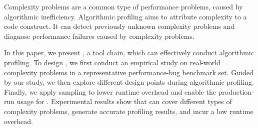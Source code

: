 Complexity problems are a common type of performance problems, 
caused by algorithmic inefficiency. 
Algorithmic profiling aims to attribute complexity to a code construct.
It can detect previously unknown complexity problems and diagnose performance failures 
caused by complexity problems. 

In this paper, we present \Tool, a tool chain, 
which can effectively conduct algorithmic profiling. 
To design \Tool, we first conduct an empirical study on 
real-world complexity problems in a representative performance-bug benchmark set. 
Guided by our study, 
we then explore different 
design points during algorithmic profiling.
Finally, we apply sampling to lower runtime 
overhead and enable the production-run usage for \Tool.
Experimental results show that \Tool 
can cover different types of complexity problems, 
generate accurate profiling results, 
and incur a low runtime overhead. 
